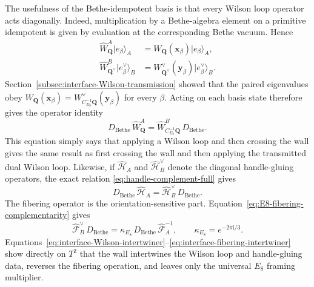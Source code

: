 \documentclass[11pt,a4paper]{article}
\numberwithin{equation}{section}
\begin{document}
The usefulness of the Bethe-idempotent basis is that every Wilson loop operator acts diagonally.  Indeed, multiplication by a Bethe-algebra element on a primitive idempotent is given by evaluation at the corresponding Bethe vacuum.  Hence
\begin{equation}
\begin{aligned}
  \widehat W_{\boldsymbol Q}^{A}|e_\beta\rangle_A
  &=W_{\boldsymbol Q}(\boldsymbol x_\beta)|e_\beta\rangle_A,\\
  \widehat W_{\boldsymbol Q^\vee}^{B}|e_\beta^\vee\rangle_{B}
  &=W_{\boldsymbol Q^\vee}^{\vee}(\boldsymbol y_\beta)|e_\beta^\vee\rangle_{B}.
\end{aligned}
  \label{eq:interface-Wilson-matrices-Bethe}
\end{equation}
Section~\ref{subsec:interface-Wilson-transmission} showed that the paired eigenvalues obey
$W_{\boldsymbol Q}(\boldsymbol x_\beta)=W_{C_{E_8}^{-1}\boldsymbol Q}^{\vee}(\boldsymbol y_\beta)$ for every $\beta$.  Acting on each basis state therefore gives the operator identity
\begin{equation}
  D_{\mathrm{Bethe}}\,
  \widehat W_{\boldsymbol Q}^{A}
  =
  \widehat W_{C_{E_8}^{-1}\boldsymbol Q}^{B}\,
  D_{\mathrm{Bethe}}.
  \label{eq:interface-Wilson-intertwiner}
\end{equation}
This equation simply says that applying a Wilson loop and then crossing the wall gives the same result as first crossing the wall and then applying the transmitted dual Wilson loop.
Likewise, if $\widehat{\mathcal H}_A$ and $\widehat{\mathcal H}_B^\vee$ denote the diagonal handle-gluing operators, the exact relation \eqref{eq:handle-complement-full} gives
\begin{equation}
  D_{\mathrm{Bethe}}\,
  \widehat{\mathcal H}_A
  =
  \widehat{\mathcal H}_B^\vee\,
  D_{\mathrm{Bethe}}.
  \label{eq:interface-handle-intertwiner}
\end{equation}
The fibering operator is the orientation-sensitive part.  Equation~\eqref{eq:E8-fibering-complementarity} gives
\begin{equation}
  \widehat{\mathcal F}_B^\vee\,
  D_{\mathrm{Bethe}}
  =
  \kappa_{E_8}\,
  D_{\mathrm{Bethe}}\,
  \widehat{\mathcal F}_A^{-1},
  \qquad
  \kappa_{E_8}=e^{-2\pi \mathrm{i}/3}.
  \label{eq:interface-fibering-intertwiner}
\end{equation}
Equations~\eqref{eq:interface-Wilson-intertwiner}--\eqref{eq:interface-fibering-intertwiner} show directly on $T^2$ that the wall intertwines the Wilson loop and handle-gluing data, reverses the fibering operation, and leaves only the universal $E_8$ framing multiplier.
\end{document}
